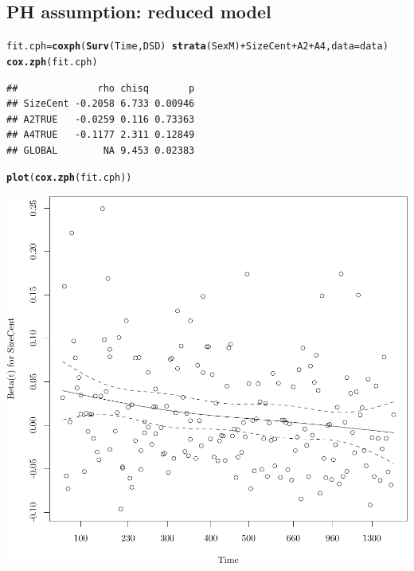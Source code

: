 \documentclass{article}\usepackage[]{graphicx}\usepackage[]{color}
\makeatletter
\def\maxwidth{ %
  \ifdim\Gin@nat@width>\linewidth
    \linewidth
  \else
    \Gin@nat@width
  \fi
}
\newcommand{\hlopt}[1]{\textcolor[rgb]{0,0,0}{#1}}%
\newcommand{\hlstd}[1]{\textcolor[rgb]{0.345,0.345,0.345}{#1}}%
\newcommand{\hlkwb}[1]{\textcolor[rgb]{0.69,0.353,0.396}{#1}}%
\newcommand{\hlkwc}[1]{\textcolor[rgb]{0.333,0.667,0.333}{#1}}%
\newcommand{\hlkwd}[1]{\textcolor[rgb]{0.737,0.353,0.396}{\textbf{#1}}}%
\newenvironment{kframe}{%
 \def\at@end@of@kframe{}%
 \ifinner\ifhmode%
  \def\at@end@of@kframe{\end{minipage}}%
  \begin{minipage}{\columnwidth}%
 \fi\fi%
 \def\FrameCommand##1{\hskip\@totalleftmargin \hskip-\fboxsep
 \colorbox{shadecolor}{##1}\hskip-\fboxsep
     \hskip-\linewidth \hskip-\@totalleftmargin \hskip\columnwidth}%
 \MakeFramed {\advance\hsize-\width
   \@totalleftmargin\z@ \linewidth\hsize
   \@setminipage}}%
 {\par\unskip\endMakeFramed%
 \at@end@of@kframe}
\newenvironment{knitrout}{}{} %
\makeatother
\begin{document}
\subsection{PH assumption: reduced model}
\begin{knitrout}
\color{fgcolor}\begin{kframe}
\begin{alltt}
\hlstd{fit.cph} \hlkwb{=} \hlkwd{coxph}\hlstd{(}\hlkwd{Surv}\hlstd{(Time, DSD)} \hlopt{~} \hlkwd{strata}\hlstd{(SexM)} \hlopt{+} \hlstd{SizeCent} \hlopt{+} \hlstd{A2} \hlopt{+} \hlstd{A4,} \hlkwc{data} \hlstd{= data)}
\hlkwd{cox.zph}\hlstd{(fit.cph)}
\end{alltt}
\begin{verbatim}
##              rho chisq       p
## SizeCent -0.2058 6.733 0.00946
## A2TRUE   -0.0259 0.116 0.73363
## A4TRUE   -0.1177 2.311 0.12849
## GLOBAL        NA 9.453 0.02383
\end{verbatim}
\begin{alltt}
\hlkwd{plot}\hlstd{(}\hlkwd{cox.zph}\hlstd{(fit.cph))}
\end{alltt}
\end{kframe}

{\centering \includegraphics[width=\maxwidth]{figure/05-eda-ph-check-reduced-1} 

}





\end{knitrout}
\end{document}
